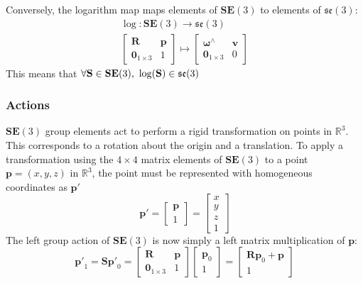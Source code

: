 			Conversely, the logarithm map maps elements of $\mathbf{SE}(3)$ to elements of $\mathfrak{se}(3)$:
			\begin{equation}
				\begin{split}
					\log: \mathbf{SE}(3) \rightarrow \mathfrak{se}(3)\\
					\begin{bmatrix}
						\mathbf{R}	&	\mathbf{p} \\
						\textbf{0}_{1 \times 3}		& 	1 					 				  
					\end{bmatrix}
					\mapsto
					\begin{bmatrix}
					 	\bm{\omega}^{\wedge}	&  \mathbf{v}\\
					 	\textbf{0}_{1 \times 3} & 0			
					\end{bmatrix}
				\end{split}		
			\end{equation}		
			This means that $\forall \mathbf{S} \in \mathbf{SE}(3)  \textnormal{, } \log(\mathbf{S}) \in  \mathfrak{se}(3)$
		
		\subsubsection{Actions}
		$\mathbf{SE}(3)$ group elements act to perform a rigid transformation on points in $\mathbb{R}^3$. This corresponds to a rotation about the origin and a translation.
		To apply a transformation using the $4 \times 4$ matrix elements of $\mathbf{SE}(3)$ to a point $\textbf{p} = (x,y,z) $ in $\mathbb{R}^3$, the point must be represented with homogeneous coordinates as $\mathbf{p'}$
		\begin{equation}
			\mathbf{p'} = 
			\begin{bmatrix}
				  \mathbf{p} \\
				  1	
			\end{bmatrix} =
			\begin{bmatrix}
				  x	\\
				  y	\\
				  z	\\
				  1	
			\end{bmatrix}
		\end{equation}
		The left group action of $\mathbf{SE}(3)$ is now simply a left matrix multiplication of $\mathbf{p}$:
		\begin{equation}
			\mathbf{p'}_1 = \mathbf{S}\mathbf{p'}_0 = 
			\begin{bmatrix}
				\mathbf{R}	&	\mathbf{p} \\
				\textbf{0}_{1 \times 3}		& 	1 					 				  
			\end{bmatrix}
			\begin{bmatrix}
				\mathbf{p}_0 \\
				1	
			\end{bmatrix}
			=
			\begin{bmatrix}
				\mathbf{R}\mathbf{p}_0 + \mathbf{p}\\
				1	
			\end{bmatrix}
		\end{equation}
		

